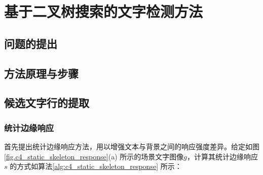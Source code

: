 ﻿%
%
%
%
%
%

\chapter{基于二叉树搜索的文字检测方法}

    \section{问题的提出}

    \section{方法原理与步骤}



    \section{候选文字行的提取}

        \subsection{统计边缘响应}
        
        首先提出统计边缘响应方法，用以增强文本与背景之间的响应强度差异。给定如图\ref{fig.c4_static_skeleton_response}(a) 所示的场景文字图像$g$，计算其统计边缘响应$s$ 的方式如算法\ref{alg:c4_static_skeleton_response} 所示：
        
